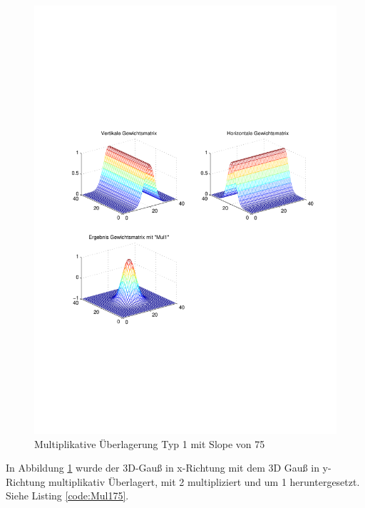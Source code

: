 \newpage
\begin{figure}[hbt]
	\centering
	\includegraphics[trim=70 191 42 152, clip, width=0.95\linewidth]{./Bilder/Auswertung/GewichtmatrixEinzelschritte/Endergebnis_Gewichtsmatrix_Slope_75_Type_Mul1}
	\caption{Multiplikative Überlagerung Typ 1 mit Slope von 75}
	\label{Mul175}
\end{figure}

In Abbildung \ref{Mul175} wurde der 3D-Gauß in x-Richtung  mit dem 3D Gauß in y-Richtung multiplikativ Überlagert, mit 2 multipliziert und um 1 heruntergesetzt. Siehe Listing \ref{code:Mul175}.



